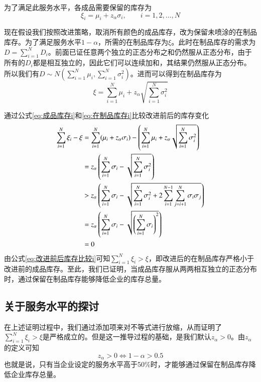 为了满足此服务水平，各成品需要保留的库存为
\begin{equation}
\xi_i = \mu_i + z_\alpha\sigma_i,\qquad i=1,2,\ldots,N
\label{eq:成品库存i}
\end{equation}

现在假设我们按照改进策略，取消所有颜色的成品库存，改为保留未喷涂的在制品库存。为了满足服务水平$1-\alpha$，所需的在制品库存为$\xi$。此时在制品库存的需求为$D=\sum_{i=1}^ND_i$。前面已证任意两个独立的正态分布之和仍然服从正态分布，由于所有的$D_i$都是相互独立的，因此它们可以连续加和，其结果仍然服从正态分布。所以我们有$D\sim N(\sum_{i=1}^N\mu_i,\sum_{i=1}^N\sigma_i^2)$。进而可以得到在制品库存为
\begin{equation}
\xi = \sum_{i=1}^N\mu_i + z_\alpha\sqrt{\sum_{i=1}^N\sigma_i^2}
\label{eq:在制品库存i}
\end{equation}

通过公式\ref{eq:成品库存i}和\ref{eq:在制品库存i}比较改进前后的库存变化
\begin{align}
\sum_{i=1}^N\xi_i - \xi &= \sum_{i=1}^N (\mu_i+z_\alpha\sigma_i) - \left(\sum_{i=1}^N\mu_i + z_\alpha\sqrt{\sum_{i=1}^N\sigma_i^2}\right) \notag\\
&= z_\alpha\left(\sum_{i=1}^N\sigma_i-\sqrt{\sum_{i=1}^N\sigma_i^2}\right) \notag\\
&> z_\alpha\left(\sum_{i=1}^N\sigma_i-\sqrt{\sum_{i=1}^N\sigma_i^2+2\sum_{i=1}^{N-1}\sum_{j=i+1}^N\sigma_i\sigma_j}\right) \notag\\
&= z_\alpha\left(\sum_{i=1}^N\sigma_i-\sqrt{\left(\sum_{i=1}^N\sigma_i\right)^2}\right) \notag\\
&= 0
\label{eq:改进前后库存比较i}
\end{align}
由公式\ref{eq:改进前后库存比较i}可知$\sum_{i=1}^N\xi_i > \xi$，即改进后的在制品库存严格小于改进前的成品库存。至此，我们已证明，当成品库存服从两两相互独立的正态分布时，通过保留在制品库存能够降低企业的库存总量。



\subsection{关于服务水平的探讨}

在上述证明过程中，我们通过添加项来对不等式进行放缩，从而证明了$\sum_{i=1}^N\xi_i > \xi$是严格成立的。但是这一推导过程的基础，是我们默认$z_\alpha>0$。由$z_\alpha$的定义可知
\[
z_\alpha>0 \Longleftrightarrow 1-\alpha > 0.5
\]
也就是说，只有当企业设定的服务水平高于50\%时，才能够通过保留在制品库存降低企业库存总量。

